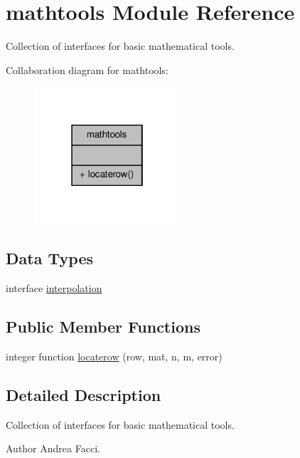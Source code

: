 \hypertarget{classmathtools}{\section{mathtools Module Reference}
\label{classmathtools}
}


Collection of interfaces for basic mathematical tools.  




Collaboration diagram for mathtools\-:
\nopagebreak
\begin{figure}[H]
\begin{center}
\leavevmode
\includegraphics[width=154pt]{classmathtools__coll__graph}
\end{center}
\end{figure}
\subsection*{Data Types}
\begin{DoxyCompactItemize}
\item 
interface \hyperlink{interfacemathtools_1_1interpolation}{interpolation}
\end{DoxyCompactItemize}
\subsection*{Public Member Functions}
\begin{DoxyCompactItemize}
\item 
integer function \hyperlink{classmathtools_a64c72087c0180d1e0cfbd7356d8a1a5a}{locaterow} (row, mat, n, m, error)
\end{DoxyCompactItemize}


\subsection{Detailed Description}
Collection of interfaces for basic mathematical tools. \begin{DoxyAuthor}{Author}
Andrea Facci. 
\end{DoxyAuthor}


